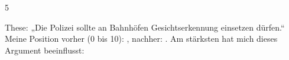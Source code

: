 \documentclass[11pt]{article}
\begin{document}
\begin{aufgabe}[Positionslinie]{5}
\begin{lueckentext}
These: „Die Polizei sollte an Bahnhöfen Gesichtserkennung einsetzen dürfen.“ Meine Position vorher (0 bis 10): , nachher: .
Am stärksten hat mich dieses Argument beeinflusst: 
\end{lueckentext}
\end{aufgabe}
\end{document}

